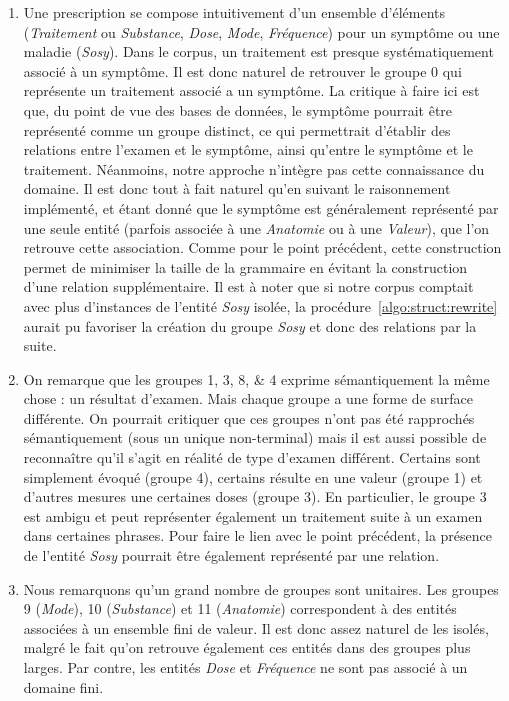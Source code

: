 \begin{enumerate}
    \item Une prescription se compose intuitivement d'un ensemble d'éléments (\emph{Traitement} ou \emph{Substance}, \emph{Dose}, \emph{Mode}, \emph{Fréquence}) pour un symptôme ou une maladie (\emph{Sosy}).
    Dans le corpus, un traitement est presque systématiquement associé à un symptôme.
    Il est donc naturel de retrouver le groupe 0 qui représente un traitement associé a un symptôme.
    La critique à faire ici est que, du point de vue des bases de données, le symptôme pourrait être représenté comme un groupe distinct, ce qui permettrait d'établir des relations entre l'examen et le symptôme, ainsi qu'entre le symptôme et le traitement.
    Néanmoins, notre approche n'intègre pas cette connaissance du domaine.
    Il est donc tout à fait naturel qu'en suivant le raisonnement implémenté, et étant donné que le symptôme est généralement représenté par une seule entité (parfois associée à une \emph{Anatomie} ou à une \emph{Valeur}), que l'on retrouve cette association.
    Comme pour le point précédent, cette construction permet de minimiser la taille de la grammaire en évitant la construction d'une relation supplémentaire.
    Il est à noter que si notre corpus comptait avec plus d'instances de l'entité \emph{Sosy} isolée, la procédure~\ref{algo:struct:rewrite} aurait pu favoriser la création du groupe \emph{Sosy} et donc des relations par la suite.

    \item On remarque que les groupes \numlist{1;3;8;4} exprime sémantiquement la même chose : un résultat d'examen.
    Mais chaque groupe a une forme de surface différente.
    On pourrait critiquer que ces groupes n'ont pas été rapprochés sémantiquement (sous un unique non-terminal) mais il est aussi possible de reconnaître qu'il s'agit en réalité de type d'examen différent.
    Certains sont simplement évoqué (groupe 4), certains résulte en une valeur (groupe 1) et d'autres mesures une certaines doses (groupe 3).
    En particulier, le groupe 3 est ambigu et peut représenter également un traitement suite à un examen dans certaines phrases.
    Pour faire le lien avec le point précédent, la présence de l'entité \emph{Sosy} pourrait être également représenté par une relation.

    \item Nous remarquons qu'un grand nombre de groupes sont unitaires.
    Les groupes 9 (\emph{Mode}), 10 (\emph{Substance}) et 11 (\emph{Anatomie}) correspondent à des entités associées à un ensemble fini de valeur.
    Il est donc assez naturel de les isolés, malgré le fait qu'on retrouve également ces entités dans des groupes plus larges.
    Par contre, les entités \emph{Dose} et \emph{Fréquence} ne sont pas associé à un domaine fini.
\end{enumerate}

